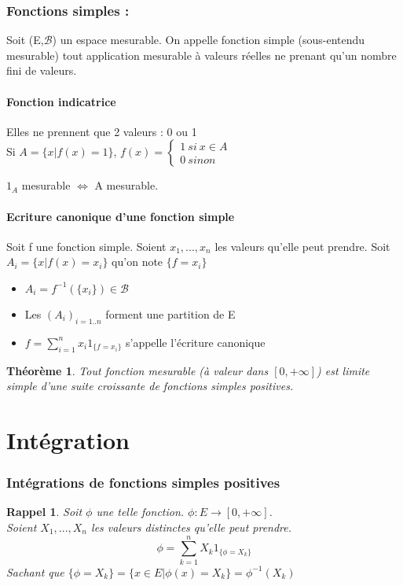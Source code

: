 \documentclass{article}
\theoremstyle{mes_theoremes}
\newtheorem{theo}{Théorème}[section]
\newtheorem*{rap}{Rappel}
\begin{document}
\section*{Fonctions simples :}
Soit (E,$\mathcal{B}$) un espace mesurable. On appelle fonction simple (sous-entendu mesurable) tout application mesurable à valeurs réelles ne prenant qu'un nombre fini de valeurs. \\
\subsection*{Fonction indicatrice}
Elles ne prennent que 2 valeurs : 0 ou 1 \\
Si $A=\{x|f(x)=1\}$, $f(x)=\left\{ \begin{array}{l} 1\ si\ x\in A\\ 0\ sinon \end{array} \right.$

$1_A$ mesurable $\Leftrightarrow$ A mesurable.

\subsection*{Ecriture canonique d'une fonction simple}
Soit f une fonction simple.
Soient $x_1,...,x_n$ les valeurs qu'elle peut prendre. Soit \\ $A_i=\{x|f(x)=x_i\}$ qu'on note $\{f=x_i\}$
\begin{itemize}
\item $A_i = f^{-1}(\{x_i\}) \in \mathcal{B} $
\item Les $(A_i)_{i=1..n}$ forment une partition de E
\item $f=\sum_{i=1}^n x_i 1_{\{f=x_i\}}$ s'appelle l'écriture canonique
\end{itemize}

\begin{theo}
Tout fonction mesurable (à valeur dans $[0,+\infty]$) est limite simple d'une suite croissante de fonctions simples positives.
\end{theo}

\newpage
\part{Intégration}
\section{Intégrations de fonctions simples positives}
\begin{rap}
Soit $\phi$ une telle fonction. $\phi : E \rightarrow [0,+\infty]$. \\
Soient $X_1,...,X_n$ les valeurs distinctes qu'elle peut prendre. \[\phi=\sum_{k=1}^n X_k 1_{\{\phi=X_k\}}\]
Sachant que $\{\phi = X_k\}=\{x\in E | \phi(x)=X_k\}=\phi^{-1}(X_k)$
\end{rap}
\end{document}
